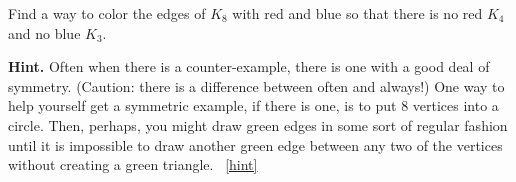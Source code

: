 \documentclass{book}
\begin{document}
\setcounter{project}{50}
\addtocounter{project}{-1}
\begin{activity}[]\label{activity-43}
\hypertarget{p-441}{}%
Find a way to color the edges of \(K_8\) with red and blue so that there is no red \(K_4\) and no blue \(K_3\).%
\par\smallskip%
\noindent\textbf{Hint.}\hypertarget{hint-20}{}\quad%
\hypertarget{p-442}{}%
Often when there is a counter-example, there is one with a good deal of symmetry. (Caution: there is a difference between often and always!) One way to help yourself get a symmetric example, if there is one, is to put 8 vertices into a circle. Then, perhaps, you might draw green edges in some sort of regular fashion until it is impossible to draw another green edge between any two of the vertices without creating a green triangle.%
~\hfill{\tiny\hyperlink{a-50}{[hint]}\hypertarget{q-50}{}}\end{activity}
\end{document}
